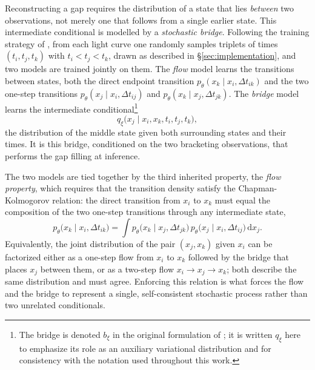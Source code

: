 Reconstructing a gap requires the distribution of a state that lies \textit{between} two observations, not merely one that follows from a single earlier state. This intermediate conditional is modelled by a \textit{stochastic bridge}. Following the training strategy of \textcite{Kiyohara2025SNF}, from each light curve one randomly samples triplets of times $(t_i, t_j, t_k)$ with $t_i < t_j < t_k$, drawn as described in \S \ref{sec:implementation}, and two models are trained jointly on them. The \textit{flow} model learns the transitions between states, both the direct endpoint transition $p_\theta(x_k \mid x_i, \Delta t_{ik})$ and the two one-step transitions $p_\theta(x_j \mid x_i, \Delta t_{ij})$ and $p_\theta(x_k \mid x_j, \Delta t_{jk})$. The \textit{bridge} model learns the intermediate conditional\footnote{The bridge is denoted $b_\xi$ in the original formulation of \textcite{Kiyohara2025SNF}; it is written $q_\xi$ here to emphasize its role as an auxiliary variational distribution and for consistency with the notation used throughout this work.}
\begin{equation}
    \label{eq:bridge}
    q_\xi\big(x_j \mid x_i, x_k, t_i, t_j, t_k\big),
\end{equation}
the distribution of the middle state given both surrounding states and their times. It is this bridge, conditioned on the two bracketing observations, that performs the gap filling at inference.

The two models are tied together by the third inherited property, the \textit{flow property}, which requires that the transition density satisfy the Chapman-Kolmogorov relation: the direct transition from $x_i$ to $x_k$ must equal the composition of the two one-step transitions through any intermediate state,
\begin{equation}
    \label{eq:chapmankolmogorov}
    p_\theta\big(x_k \mid x_i, \Delta t_{ik}\big) = \int p_\theta\big(x_k \mid x_j, \Delta t_{jk}\big)\, p_\theta\big(x_j \mid x_i, \Delta t_{ij}\big)\,\mathrm{d}x_j.
\end{equation}
Equivalently, the joint distribution of the pair $(x_j, x_k)$ given $x_i$ can be factorized either as a one-step flow from $x_i$ to $x_k$ followed by the bridge that places $x_j$ between them, or as a two-step flow $x_i \rightarrow x_j \rightarrow x_k$; both describe the same distribution and must agree. Enforcing this relation is what forces the flow and the bridge to represent a single, self-consistent stochastic process rather than two unrelated conditionals.

